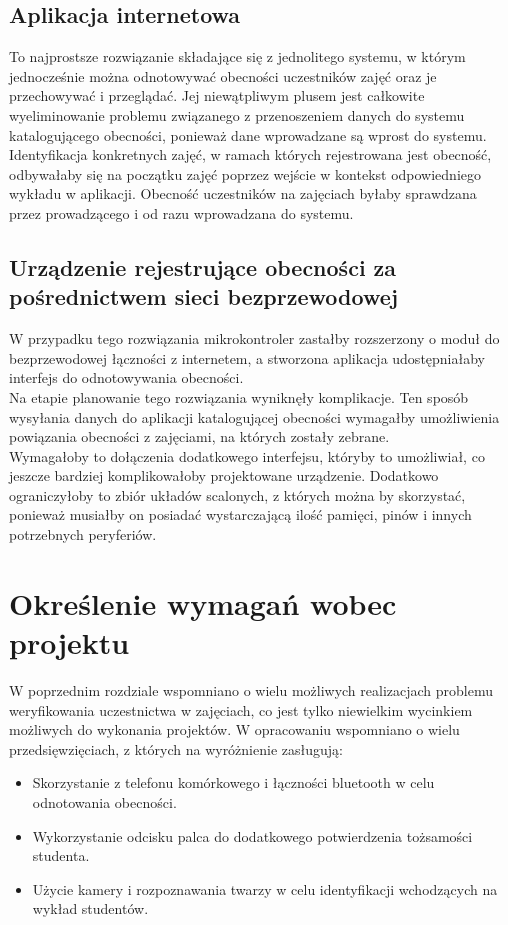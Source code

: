 \documentclass[declaration,shortabstract, mgr]{iithesis}
\begin{document}
\subsection{Aplikacja internetowa}
\indent To najprostsze rozwiązanie składające się z jednolitego systemu, w którym jednocześnie można odnotowywać obecności uczestników zajęć oraz je przechowywać i przeglądać. Jej niewątpliwym plusem jest całkowite wyeliminowanie problemu związanego z przenoszeniem danych do systemu katalogującego obecności, ponieważ dane wprowadzane są wprost do systemu. Identyfikacja konkretnych zajęć, w ramach których rejestrowana jest obecność, odbywałaby się na początku zajęć poprzez wejście w kontekst odpowiedniego wykładu w aplikacji. Obecność uczestników na zajęciach byłaby sprawdzana przez prowadzącego i od razu wprowadzana do systemu. \\

\subsection{Urządzenie rejestrujące obecności za pośrednictwem sieci bezprzewodowej}
\indent W przypadku tego rozwiązania mikrokontroler zastałby rozszerzony o moduł do bezprzewodowej łączności z internetem, a stworzona aplikacja udostępniałaby interfejs do odnotowywania obecności. \\
\indent Na etapie planowanie tego rozwiązania wyniknęły komplikacje. Ten sposób wysyłania danych do aplikacji katalogującej obecności wymagałby umożliwienia powiązania obecności z zajęciami, na których zostały zebrane. \\
\indent Wymagałoby to dołączenia dodatkowego interfejsu, któryby to umożliwiał, co jeszcze bardziej komplikowałoby projektowane urządzenie. Dodatkowo ograniczyłoby to zbiór układów scalonych, z których można by skorzystać, ponieważ musiałby on posiadać wystarczającą ilość pamięci, pinów i innych potrzebnych peryferiów.

\section{Określenie wymagań wobec projektu}
\indent W poprzednim rozdziale wspomniano o wielu możliwych realizacjach problemu weryfikowania uczestnictwa w zajęciach, co jest tylko niewielkim wycinkiem możliwych do wykonania projektów. W opracowaniu \cite{review} wspomniano o wielu przedsięwzięciach, z których na wyróżnienie zasługują:

\begin{itemize}
\item Skorzystanie z telefonu komórkowego i łączności bluetooth w celu odnotowania obecności.
\item Wykorzystanie odcisku palca do dodatkowego potwierdzenia tożsamości studenta.
\item Użycie kamery i rozpoznawania twarzy w celu identyfikacji wchodzących na wykład studentów.
\end{itemize}
\end{document}
